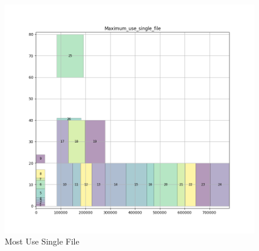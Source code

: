 \documentclass[a4paper]{article}
\begin{document}
\begin{figure}[H]
\begin{minipage}[b]{0.5\linewidth}
    \includegraphics[width=1.11\linewidth]{MBSS/plot/Gantt_charts/MUSF_LeftShift.png} 
    \caption{Most Use Single File} 
    \vspace{4ex}
  \end{minipage}%
\end{figure}
\end{document}
